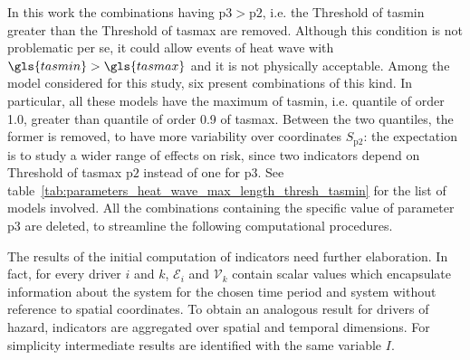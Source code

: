 In this work the combinations having $\mathrm{p3} > \mathrm{p2}$, i.e. the {Threshold of \gls{tasmin}} greater than the {Threshold of \gls{tasmax}} are removed. Although this condition is not problematic per se, it could allow events of heat wave with $\gls{tasmin} > \gls{tasmax}$ and it is not physically acceptable. Among the model considered for this study, six present combinations of this kind. In particular, all these models have the maximum of \gls{tasmin}, i.e. quantile of order \num{1.0}, greater than quantile of order \num{0.9} of \gls{tasmax}. Between the two quantiles, the former is removed, to have more variability over coordinates $S_\mathrm{p2}$: the expectation is to study a wider range of effects on risk, since two indicators depend on {Threshold of \gls{tasmax}} $\mathrm{p2}$ instead of one for $\mathrm{p3}$. See table~\ref{tab:parameters_heat_wave_max_length_thresh_tasmin} for the list of models involved. All the combinations containing the specific value of parameter $\mathrm{p3}$ are deleted, to streamline the following computational procedures.

The results of the initial computation of indicators need further elaboration. In fact, for every \gls{driver} $i$ and $k$, $\mathcal{E}_i$ and $\mathcal{V}_k$ contain scalar values which encapsulate information about the system for the chosen time period and system without reference to spatial coordinates. To obtain an analogous result for \glspl{driver} of \gls{hazard}, \glspl{indicator} are aggregated over spatial and temporal dimensions. For simplicity intermediate results are identified with the same variable $I$.



